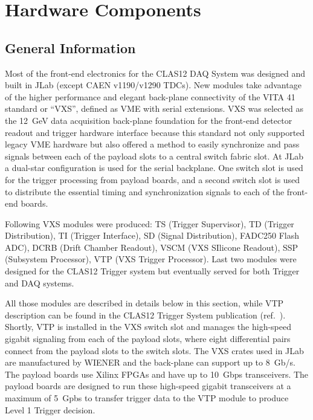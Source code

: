 \section{Hardware Components}

\subsection{General Information}

Most of the front-end electronics for the CLAS12 DAQ System was designed and built in JLab (except CAEN v1190/v1290 TDCs). New modules take advantage of the higher performance and elegant back-plane connectivity of the VITA 41 standard or ``VXS'', defined as VME with serial extensions.  VXS was selected as the 12~GeV data acquisition back-plane foundation for the front-end detector readout and trigger hardware interface because this standard not only supported legacy VME hardware but also offered a method to easily synchronize and pass signals between each of the payload slots to a central switch fabric slot. At JLab a dual-star configuration is used for the serial backplane. One switch slot is used for the trigger processing from payload boards, and a second switch slot is used to distribute the essential timing and synchronization signals to each of the front-end boards.

Following VXS modules were produced: TS (Trigger Supervisor), TD (Trigger Distribution), TI (Trigger Interface), SD (Signal Distribution), FADC250 Flash ADC), DCRB (Drift Chamber Readout), VSCM (VXS SIlicone Readout), SSP (Subsystem Processor), VTP (VXS Trigger Processor). Last two modules were designed for the CLAS12 Trigger system but eventually served for both Trigger and DAQ systems.

All those modules are described in details below in this section, while VTP description can be found in the CLAS12 Trigger System publication (ref.~\cite{trig-ref}). Shortly, VTP is installed in the VXS switch slot and manages the high-speed gigabit signaling from each of the payload slots, where eight differential pairs connect from the payload slots to the switch slots. The VXS crates used in JLab are manufactured by WIENER and the back-plane can support up to 8~Gb/s. The payload boards use Xilinx FPGAs and have up to 10~Gbps transceivers. The payload boards are designed to run these high-speed gigabit transceivers at a maximum of 5~Gpbs to transfer trigger data to the VTP module to produce Level 1 Trigger decision.

